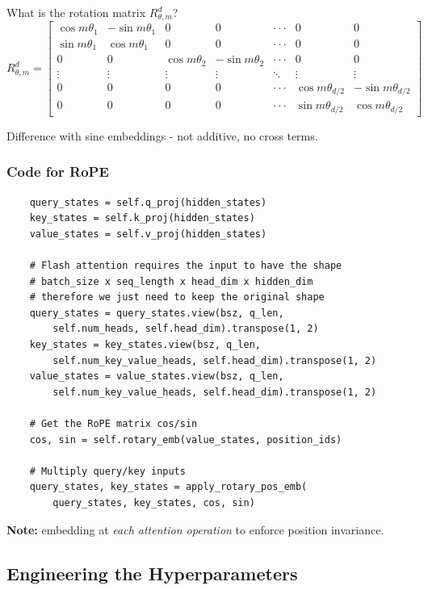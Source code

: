 \documentclass[12pt,twoside]{article}
\begin{document}
What is the rotation matrix \(R_{\theta, m}^d\)?
\[
    R_{\theta, m}^{d} = \begin{bmatrix}
        \cos m\theta_1 & -\sin m\theta_1 & 0 & 0 & \cdot \cdot \cdot & 0 & 0 \\
        \sin m\theta_1 & \cos m\theta_1 & 0 & 0 & \cdot \cdot \cdot & 0 & 0 \\
        0 & 0 & \cos m\theta_2 & -\sin m\theta_2 & \cdot \cdot \cdot & 0 & 0 \\
        \vdots & \vdots & \vdots & \vdots & \ddots & \vdots & \vdots \\
        0 & 0 & 0 & 0 & \cdot \cdot \cdot & \cos m\theta_{d / 2} & - \sin m\theta_{d / 2} \\
        0 & 0 & 0 & 0 & \cdot \cdot \cdot & \sin m \theta_{d / 2} & \cos m \theta_{d / 2}
    \end{bmatrix}
\]

Difference with sine embeddings - not additive, no cross terms.

\subsubsection*{Code for RoPE}

\begin{verbatim}
    query_states = self.q_proj(hidden_states) 
    key_states = self.k_proj(hidden_states)
    value_states = self.v_proj(hidden_states)

    # Flash attention requires the input to have the shape
    # batch_size x seq_length x head_dim x hidden_dim
    # therefore we just need to keep the original shape
    query_states = query_states.view(bsz, q_len, 
        self.num_heads, self.head_dim).transpose(1, 2)
    key_states = key_states.view(bsz, q_len, 
        self.num_key_value_heads, self.head_dim).transpose(1, 2)
    value_states = value_states.view(bsz, q_len, 
        self.num_key_value_heads, self.head_dim).transpose(1, 2)
    
    # Get the RoPE matrix cos/sin
    cos, sin = self.rotary_emb(value_states, position_ids)

    # Multiply query/key inputs
    query_states, key_states = apply_rotary_pos_emb(
        query_states, key_states, cos, sin)
\end{verbatim}

\textbf{Note:} embedding at \textit{each attention operation} to enforce position invariance.

\subsection*{Engineering the Hyperparameters}
\end{document}
